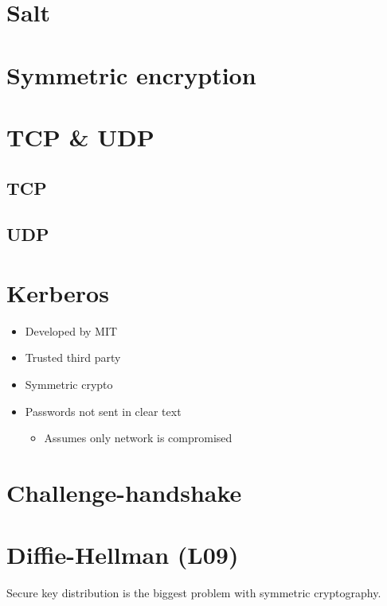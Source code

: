 \documentclass{easyclass}
\begin{document}
\chapter{Salt}

\chapter{Symmetric encryption}

\chapter{TCP \& UDP}
\section{TCP}
\section{UDP}

\chapter{Kerberos}
\begin{itemize}
    \item Developed by MIT
    \item Trusted third party
    \item Symmetric crypto
    \item Passwords not sent in clear text
    \begin{itemize}
        \item Assumes only network is compromised
    \end{itemize}
\end{itemize}
\chapter{Challenge-handshake}

\chapter{Diffie-Hellman (L09)}
Secure key distribution is the biggest problem with symmetric cryptography.
\end{document}
